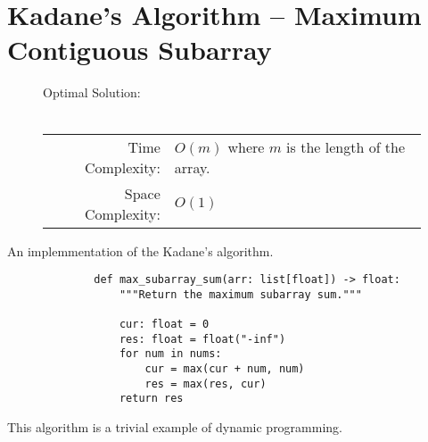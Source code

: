 
\section{Kadane's Algorithm -- Maximum Contiguous Subarray}

\begin{figure}[H]
    Optimal Solution:\\\\
    \begin{tabular}{rl}
        Time Complexity:& \(O(m)\) where \(m\) is the length of the array.\\
        Space Complexity:& \(O(1)\)
    \end{tabular}
\end{figure}

An implemmentation of the Kadane's algorithm.

\begin{figure}[H]
    \centering
    \begin{verbatim}
        def max_subarray_sum(arr: list[float]) -> float:
            """Return the maximum subarray sum."""

            cur: float = 0
            res: float = float("-inf")
            for num in nums:
                cur = max(cur + num, num)
                res = max(res, cur)
            return res
    \end{verbatim}
\end{figure}

This algorithm is a trivial example of dynamic programming.
